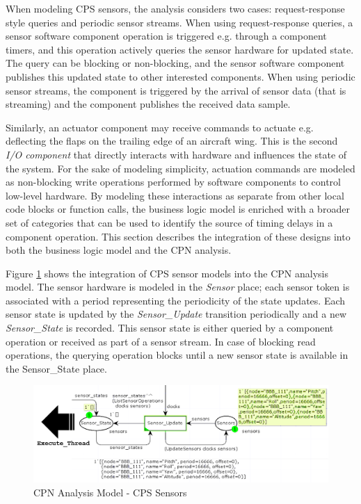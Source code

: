 
When modeling CPS sensors, the analysis considers two cases: request-response style queries and periodic sensor streams. When using request-response queries, a sensor software component operation is triggered e.g. through a component timers, and this operation actively queries the sensor hardware for updated state. The query can be blocking or non-blocking, and the sensor software component publishes this updated state to other interested components. When using periodic sensor streams, the component is triggered by the arrival of sensor data (that is streaming) and the component publishes the received data sample. 

Similarly, an actuator component may receive commands to actuate e.g. deflecting the flaps on the trailing edge of an aircraft wing. This is the second \emph{I/O component} that directly interacts with hardware and influences the state of the system. For the sake of modeling simplicity, actuation commands are modeled as non-blocking write operations performed by software components to control low-level hardware. By modeling these interactions as separate from other local code blocks or function calls, the business logic model is enriched with a broader set of categories that can be used to identify the source of timing delays in a component operation. This section describes the integration of these designs into both the business logic model and the CPN analysis. 

Figure \ref{fig:sensors} shows the integration of CPS sensor models into the CPN analysis model. The sensor hardware is modeled in the \emph{Sensor} place; each sensor token is associated with a period representing the periodicity of the state updates. Each sensor state is updated by the \emph{Sensor\_Update} transition periodically and a new \emph{Sensor\_State} is recorded. This sensor state is either queried by a component operation or received as part of a sensor stream. In case of blocking read operations, the querying operation blocks until a new sensor state is available in the Sensor\_State place. 

\begin{figure}[ht]
	\centering
	\includegraphics[width=\textwidth]{./img/sensors}
	\caption{CPN Analysis Model - CPS Sensors}
	\label{fig:sensors}
\end{figure}
\FloatBarrier

